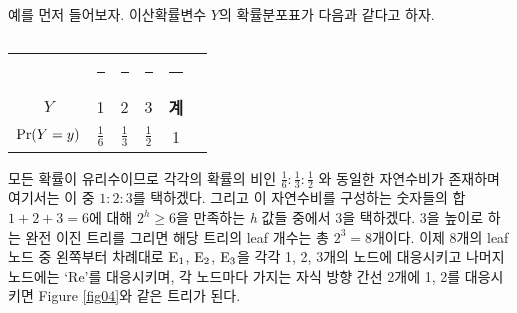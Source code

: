 \documentclass[11pt]{article}
\begin{document}
예를 먼저 들어보자. 이산확률변수 $Y$의 확률분포표가 다음과 같다고 하자.
\\
\begin{table}[h]
\centering
\begin{tabular}{cccccc}
\toprule
 & \rule{0.8cm}{0pt} & \rule{0.3cm}{0pt} & \rule{0.8cm}{0pt} & \rule{0.4cm}{0pt} \\[-\arraystretch\normalbaselineskip]
$Y$ & 1 & 2 & 3 & \textbf{계} \\
\midrule
$\textnormal{Pr}(Y=y)$ & $\displaystyle \frac{1}{6}$ & $\displaystyle \frac{1}{3}$ & $\displaystyle \frac{1}{2}$ & 1 \\
\bottomrule
\end{tabular}
\caption{}
\label{tab03}
\end{table}

\noindent 모든 확률이 유리수이므로 각각의 확률의 비인 $\frac{1}{6}:\frac{1}{3}:\frac{1}{2}$ 와 동일한 자연수비가 존재하며 여기서는 이 중 $1:2:3$를 택하겠다. 그리고 이 자연수비를 구성하는 숫자들의 합 $1+2+3=6$에 대해 $2^{h} \ge 6$을 만족하는 \textit{h} 값들 중에서 3을 택하겠다. 3을 높이로 하는 완전 이진 트리를 그리면 해당 트리의 leaf 개수는 총 $2^{3}=8$개이다. 이제 8개의 leaf 노드 중 왼쪽부터 차례대로 $\textnormal{E}_{1}$, $\textnormal{E}_{2}$, $\textnormal{E}_{3}$을 각각 1, 2, 3개의 노드에 대응시키고 나머지 노드에는 `Re'를 대응시키며, 각 노드마다 가지는 자식 방향 간선 2개에 1, 2를 대응시키면 Figure \ref{fig04}와 같은 트리가 된다.
\\
\end{document}
